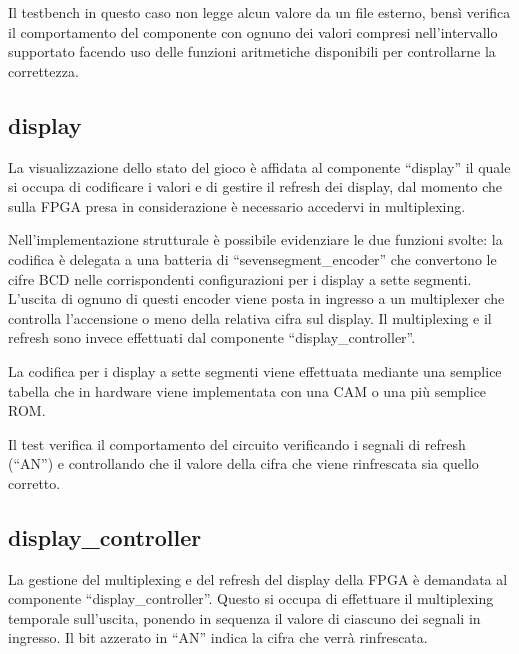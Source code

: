 \documentclass [11pt,a4paper,oneside]{article}
\begin{document}


Il testbench in questo caso non legge alcun valore da un file esterno,
bensì verifica il comportamento del componente con ognuno dei valori
compresi nell'intervallo supportato facendo uso delle funzioni
aritmetiche disponibili per controllarne la correttezza.

\subsection{display}

La visualizzazione dello stato del gioco è affidata al componente
``display'' il quale si occupa di codificare i valori e di gestire
il refresh dei display, dal momento che sulla FPGA presa in 
considerazione è necessario accedervi in multiplexing.



Nell'implementazione strutturale è possibile evidenziare le due
funzioni svolte: la codifica è delegata a una batteria di
``sevensegment\_encoder'' che convertono le cifre BCD nelle
corrispondenti configurazioni per i display a sette segmenti.
L'uscita di ognuno di questi encoder viene posta in ingresso a
un multiplexer che controlla l'accensione o meno della relativa
cifra sul display. Il multiplexing e il refresh sono invece
effettuati dal componente ``display\_controller''.



La codifica per i display a sette segmenti viene effettuata
mediante una semplice tabella che in hardware viene
implementata con una CAM o una più semplice ROM.



Il test verifica il comportamento del circuito verificando
i segnali di refresh (``AN'') e controllando che il valore
della cifra che viene rinfrescata sia quello corretto.

\subsection{display\_controller}

La gestione del multiplexing e del refresh del display della FPGA
è demandata al componente ``display\_controller''. Questo si occupa
di effettuare il multiplexing temporale sull'uscita, ponendo in
sequenza il valore di ciascuno dei segnali in ingresso. Il bit 
azzerato in ``AN'' indica la cifra che verrà rinfrescata.
\end{document}
